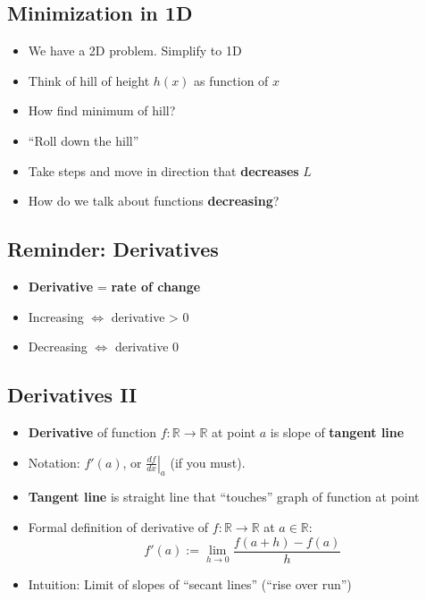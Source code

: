 \hypertarget{minimization-in-1d}{%
\subsection{Minimization in 1D}\label{minimization-in-1d}}

\begin{itemize}
\item
  We have a 2D problem. Simplify to 1D
\item
  Think of hill of height \(h(x)\) as function of \(x\)
\item
  How find minimum of hill?
\item
  ``Roll down the hill''
\item
  Take steps and move in direction that \textbf{decreases} \(L\)
\item
  How do we talk about functions \textbf{decreasing}?
\end{itemize}

\hypertarget{reminder-derivatives}{%
\subsection{Reminder: Derivatives}\label{reminder-derivatives}}

\begin{itemize}
\item
  \textbf{Derivative} = \textbf{rate of change}
\item
  Increasing \(\Longleftrightarrow\) derivative \textgreater{} 0
\item
  Decreasing \(\Longleftrightarrow\) derivative 0
\end{itemize}

\hypertarget{derivatives-ii}{%
\subsection{Derivatives II}\label{derivatives-ii}}

\begin{itemize}
\item
  \textbf{Derivative} of function \(f: \mathbb{R} \to \mathbb{R}\) at
  point \(a\) is slope of \textbf{tangent line}
\item
  Notation: \(f'(a)\), or \(\left. \frac{df}{dx} \right| _a\) (if you
  must).
\item
  \textbf{Tangent line} is straight line that ``touches'' graph of
  function at point
\item
  Formal definition of derivative of \(f: \mathbb{R} \to \mathbb{R}\) at
  \(a \in \mathbb{R}\):
  \[f'(a) := \lim_{h \to 0} \frac{f(a + h) - f(a)}{h}\]
\item
  Intuition: Limit of slopes of ``secant lines'' (``rise over run'')
\end{itemize}

